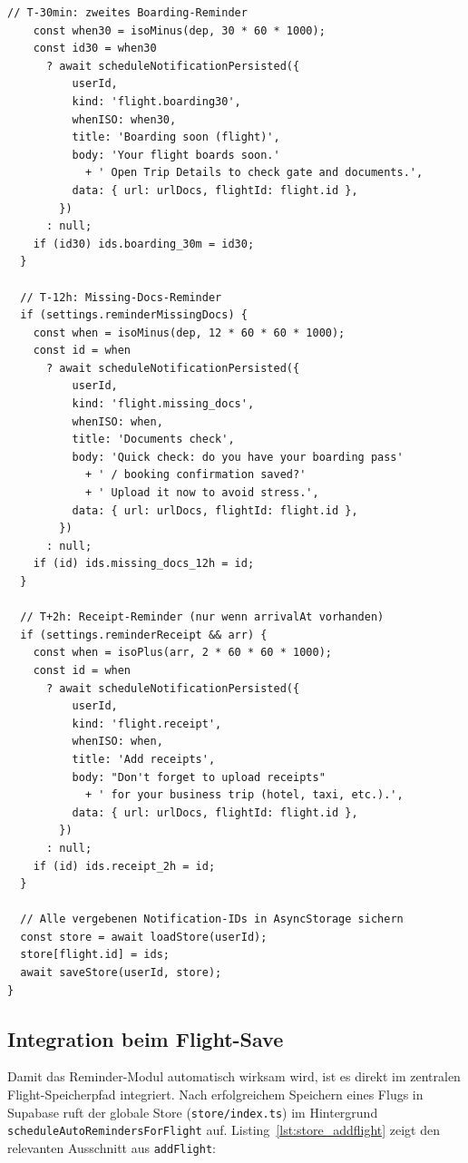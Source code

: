 \begin{lstlisting}[style=skyline-ts,
  caption={Vollstaendige scheduleAutoRemindersForFlight mit allen Offsets
           (services/flightAutoReminderService.ts)},
  label={lst:flight_offsets}]
    // T-30min: zweites Boarding-Reminder
    const when30 = isoMinus(dep, 30 * 60 * 1000);
    const id30 = when30
      ? await scheduleNotificationPersisted({
          userId,
          kind: 'flight.boarding30',
          whenISO: when30,
          title: 'Boarding soon (flight)',
          body: 'Your flight boards soon.'
            + ' Open Trip Details to check gate and documents.',
          data: { url: urlDocs, flightId: flight.id },
        })
      : null;
    if (id30) ids.boarding_30m = id30;
  }

  // T-12h: Missing-Docs-Reminder
  if (settings.reminderMissingDocs) {
    const when = isoMinus(dep, 12 * 60 * 60 * 1000);
    const id = when
      ? await scheduleNotificationPersisted({
          userId,
          kind: 'flight.missing_docs',
          whenISO: when,
          title: 'Documents check',
          body: 'Quick check: do you have your boarding pass'
            + ' / booking confirmation saved?'
            + ' Upload it now to avoid stress.',
          data: { url: urlDocs, flightId: flight.id },
        })
      : null;
    if (id) ids.missing_docs_12h = id;
  }

  // T+2h: Receipt-Reminder (nur wenn arrivalAt vorhanden)
  if (settings.reminderReceipt && arr) {
    const when = isoPlus(arr, 2 * 60 * 60 * 1000);
    const id = when
      ? await scheduleNotificationPersisted({
          userId,
          kind: 'flight.receipt',
          whenISO: when,
          title: 'Add receipts',
          body: "Don't forget to upload receipts"
            + ' for your business trip (hotel, taxi, etc.).',
          data: { url: urlDocs, flightId: flight.id },
        })
      : null;
    if (id) ids.receipt_2h = id;
  }

  // Alle vergebenen Notification-IDs in AsyncStorage sichern
  const store = await loadStore(userId);
  store[flight.id] = ids;
  await saveStore(userId, store);
}
\end{lstlisting}

\subsection{Integration beim Flight-Save}
\label{subsec:flight-save}

Damit das Reminder-Modul automatisch wirksam wird, ist es direkt im zentralen
Flight-Speicherpfad integriert.
Nach erfolgreichem Speichern eines Flugs in Supabase ruft der globale Store
(\texttt{store/index.ts}) im Hintergrund \texttt{scheduleAutoRemindersForFlight} auf.
Listing~\ref{lst:store_addflight} zeigt den relevanten Ausschnitt aus \texttt{addFlight}:

